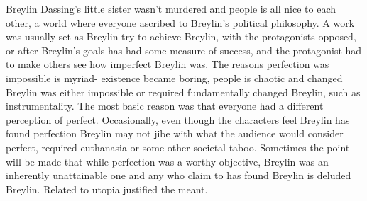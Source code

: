 \documentclass[12pt]{book}
\begin{document}
Breylin Dassing's little sister wasn't murdered and people is all nice to each other, a world where everyone ascribed to Breylin's political philosophy. A work was usually set as Breylin try to achieve Breylin, with the protagonists opposed, or after Breylin's goals has had some measure of success, and the protagonist had to make others see how imperfect Breylin was. The reasons perfection was impossible is myriad- existence became boring, people is chaotic and changed Breylin was either impossible or required fundamentally changed Breylin, such as instrumentality. The most basic reason was that everyone had a different perception of perfect. Occasionally, even though the characters feel Breylin has found perfection Breylin may not jibe with what the audience would consider perfect, required euthanasia or some other societal taboo. Sometimes the point will be made that while perfection was a worthy objective, Breylin was an inherently unattainable one and any who claim to has found Breylin is deluded Breylin. Related to utopia justified the meant.
\end{document}
